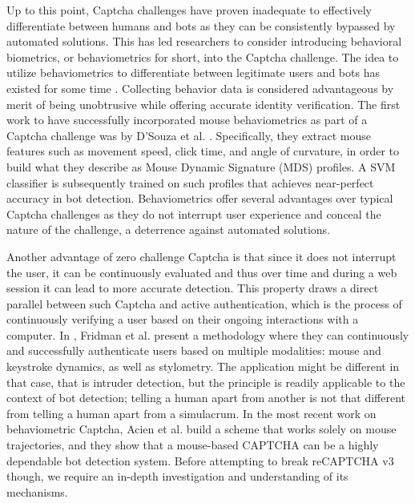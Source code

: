 Up to this point, Captcha challenges have proven inadequate to effectively differentiate between humans and bots as they can be consistently bypassed by automated solutions.
This has led researchers to consider introducing behavioral biometrics, or behaviometrics for short, into the Captcha challenge.
The idea to utilize behaviometrics to differentiate between legitimate users and bots has existed for some time \cite{yampolskiy2006use, chu2013blog}.
Collecting behavior data is considered advantageous by merit of being unobtrusive while offering accurate identity verification.
The first work to have successfully incorporated mouse behaviometrics as part of a Captcha challenge was by D'Souza et al. \cite{d2014avatar}.
Specifically, they extract mouse features such as movement speed, click time, and angle of curvature, in order to build what they describe as Mouse Dynamic Signature (MDS) profiles.
A \gls{SVM} classifier is subsequently trained on such profiles that achieves near-perfect accuracy in bot detection.
Behaviometrics offer several advantages over typical Captcha challenges as they do not interrupt user experience and conceal the nature of the challenge, a deterrence against automated solutions.

Another advantage of zero challenge Captcha is that since it does not interrupt the user, it can be continuously evaluated and thus over time and during a web session it can lead to more accurate detection.
This property draws a direct parallel between such Captcha and active authentication, which is the process of continuously verifying a user based on their ongoing interactions with a computer.
In \cite{fridman2015multi}, Fridman et al. present a methodology where they can continuously and successfully authenticate users based on multiple modalities: mouse and keystroke dynamics, as well as stylometry.
The application might be different in that case, that is intruder detection, but the principle is readily applicable to the context of bot detection; telling a human apart from another is not that different from telling a human apart from a simulacrum.
In the most recent work on behaviometric Captcha, Acien et al. \cite{acien2020becaptcha} build a scheme that works solely on mouse trajectories, and they show that a mouse-based CAPTCHA can be a highly dependable bot detection system.
Before attempting to break reCAPTCHA v3 though, we require an in-depth investigation and understanding of its mechanisms.



